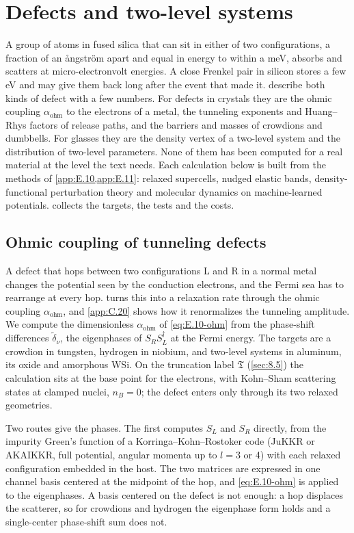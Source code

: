 \section{Defects and two-level systems}\label{app:E.22}

A group of atoms in fused silica that can sit in either of two configurations, a fraction of an \r{a}ngstr\"om apart and equal in energy to within a meV, absorbs and scatters at micro-electronvolt energies. A close Frenkel pair in silicon stores a few eV and may give them back long after the event that made it.  describe both kinds of defect with a few numbers. For defects in crystals they are the ohmic coupling $\alpha_{\mathrm{ohm}}$ to the electrons of a metal, the tunneling exponents and Huang--Rhys factors of release paths, and the barriers and masses of crowdions and dumbbells. For glasses they are the density vertex of a two-level system and the distribution of two-level parameters. None of them has been computed for a real material at the level the text needs. Each calculation below is built from the methods of \cref{app:E.10,app:E.11}: relaxed supercells, nudged elastic bands, density-functional perturbation theory and molecular dynamics on machine-learned potentials.  collects the targets, the tests and the costs.

\subsection{Ohmic coupling of tunneling defects}

A defect that hops between two configurations L and R in a normal metal changes the potential seen by the conduction electrons, and the Fermi sea has to rearrange at every hop.  turns this into a relaxation rate through the ohmic coupling $\alpha_{\mathrm{ohm}}$, and \cref{app:C.20} shows how it renormalizes the tunneling amplitude. We compute the dimensionless $\alpha_{\mathrm{ohm}}$ of \cref{eq:E.10-ohm} from the phase-shift differences $\tilde\delta_\nu$, the eigenphases of $S_RS_L^\dagger$ at the Fermi energy. The targets are a crowdion in tungsten, hydrogen in niobium, and two-level systems in aluminum, its oxide and amorphous WSi. On the truncation label $\mathfrak{T}$ (\cref{sec:8.5}) the calculation sits at the base point for the electrons, with Kohn--Sham scattering states at clamped nuclei, $n_B = 0$; the defect enters only through its two relaxed geometries.

Two routes give the phases. The first computes $S_L$ and $S_R$ directly, from the impurity Green's function of a Korringa--Kohn--Rostoker code (JuKKR or AKAIKKR, full potential, angular momenta up to $l = 3$ or 4) with each relaxed configuration embedded in the host. The two matrices are expressed in one channel basis centered at the midpoint of the hop, and \cref{eq:E.10-ohm} is applied to the eigenphases. A basis centered on the defect is not enough: a hop displaces the scatterer, so for crowdions and hydrogen the eigenphase form holds and a single-center phase-shift sum does not.


